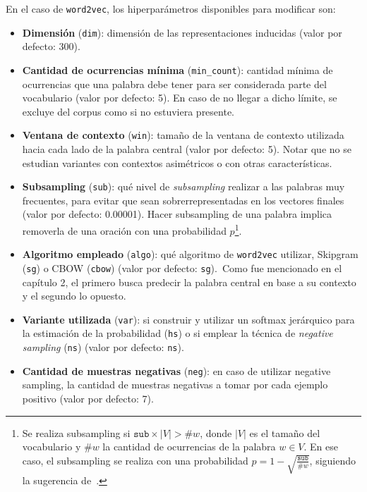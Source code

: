 En el caso de \texttt{word2vec}, los hiperparámetros disponibles para modificar son:

\begin{itemize}

\item \textbf{Dimensión} (\texttt{dim}): dimensión de las representaciones inducidas (valor por
defecto: 300).

\item \textbf{Cantidad de ocurrencias mínima} (\texttt{min\_count}): cantidad mínima de ocurrencias
que una palabra debe tener para ser considerada parte del vocabulario (valor por defecto: 5). En
caso de no llegar a dicho límite, se excluye del corpus como si no estuviera presente.

\item \textbf{Ventana de contexto} (\texttt{win}): tamaño de la ventana de contexto utilizada hacia
cada lado de la palabra central (valor por defecto: 5). Notar que no se estudian variantes con
contextos asimétricos o con otras características.

\item \textbf{Subsampling} (\texttt{sub}): qué nivel de \textit{subsampling} realizar a las palabras
muy frecuentes, para evitar que sean sobrerrepresentadas en los vectores finales (valor por defecto:
0.00001). Hacer subsampling de una palabra implica removerla de una oración con una probabilidad
$p$\footnote{Se realiza subsampling si $\mathtt{sub} \times |V| > \#w$, donde $|V|$ es el tamaño del
vocabulario y $\#w$ la cantidad de ocurrencias de la palabra $w \in V$. En ese caso, el subsampling
se realiza con una probabilidad $p = 1 - \sqrt{\frac{\mathtt{sub}}{\#w}}$, siguiendo la sugerencia
de~\cite{Levy2015}.}.

\item \textbf{Algoritmo empleado} (\texttt{algo}): qué algoritmo de \texttt{word2vec} utilizar,
Skipgram (\texttt{sg}) o CBOW (\texttt{cbow}) (valor por defecto: \texttt{sg}).\ Como fue mencionado
en el capítulo 2, el primero busca predecir la palabra central en base a su contexto y el segundo lo
opuesto.

\item \textbf{Variante utilizada} (\texttt{var}): si construir y utilizar un softmax jerárquico para
la estimación de la probabilidad (\texttt{hs}) o si emplear la técnica de \textit{negative sampling}
(\texttt{ns}) (valor por defecto: \texttt{ns}).

\item \textbf{Cantidad de muestras negativas} (\texttt{neg}): en caso de utilizar negative sampling,
la cantidad de muestras negativas a tomar por cada ejemplo positivo (valor por defecto: 7).


\end{itemize}
